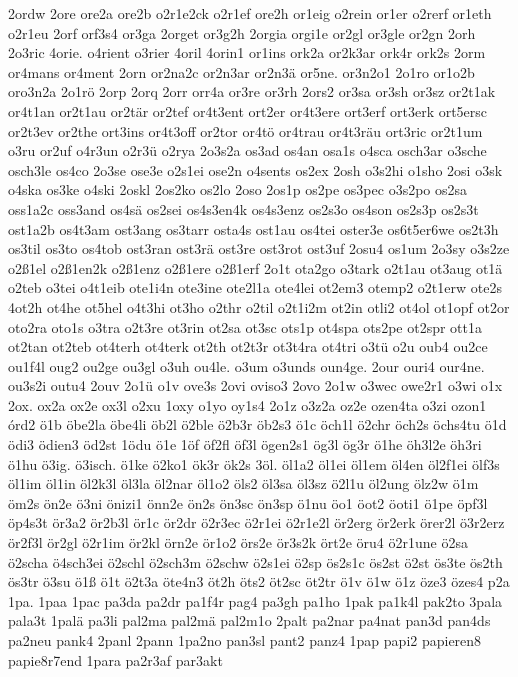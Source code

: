 {2ordw
2ore
ore2a
ore2b
o2r1e2ck
o2r1ef
ore2h
or1eig
o2rein
or1er
o2rerf
or1eth
o2r1eu
2orf
orf3s4
or3ga
2orget
or3g2h
2orgia
orgi1e
or2gl
or3gle
or2gn
2orh
2o3ric
4orie.
o4rient
o3rier
4oril
4orin1
or1ins
ork2a
or2k3ar
ork4r
ork2s
2orm
or4mans
or4ment
2orn
or2na2c
or2n3ar
or2n3ä
or5ne.
or3n2o1
2o1ro
or1o2b
oro3n2a
2o1rö
2orp
2orq
2orr
orr4a
or3re
or3rh
2ors2
or3sa
or3sh
or3sz
or2t1ak
or4t1an
or2t1au
or2tär
or2tef
or4t3ent
ort2er
or4t3ere
ort3erf
ort3erk
ort5ersc
or2t3ev
or2the
ort3ins
or4t3off
or2tor
or4tö
or4trau
or4t3räu
ort3ric
or2t1um
o3ru
or2uf
o4r3un
o2r3ü
o2rya
2o3s2a
os3ad
os4an
osa1s
o4sca
osch3ar
o3sche
osch3le
os4co
2o3se
ose3e
o2s1ei
ose2n
o4sents
os2ex
2osh
o3s2hi
o1sho
2osi
o3sk
o4ska
os3ke
o4ski
2oskl
2os2ko
os2lo
2oso
2os1p
os2pe
os3pec
o3s2po
os2sa
oss1a2c
oss3and
os4sä
os2sei
os4s3en4k
os4s3enz
os2s3o
os4son
os2s3p
os2s3t
ost1a2b
os4t3am
ost3ang
os3tarr
osta4s
ost1au
os4tei
oster3e
os6t5er6we
os2t3h
os3til
os3to
os4tob
ost3ran
ost3rä
ost3re
ost3rot
ost3uf
2osu4
os1um
2o3sy
o3s2ze
o2ß1el
o2ß1en2k
o2ß1enz
o2ß1ere
o2ß1erf
2o1t
ota2go
o3tark
o2t1au
ot3aug
ot1ä
o2teb
o3tei
o4t1eib
ote1i4n
ote3ine
ote2l1a
ote4lei
ot2em3
otemp2
o2t1erw
ote2s
4ot2h
ot4he
ot5hel
o4t3hi
ot3ho
o2thr
o2til
o2t1i2m
ot2in
otli2
ot4ol
ot1opf
ot2or
oto2ra
oto1s
o3tra
o2t3re
ot3rin
ot2sa
ot3sc
ots1p
ot4spa
ots2pe
ot2spr
ott1a
ot2tan
ot2teb
ot4terh
ot4terk
ot2th
ot2t3r
ot3t4ra
ot4tri
o3tü
o2u
oub4
ou2ce
ou1f4l
oug2
ou2ge
ou3gl
o3uh
ou4le.
o3um
o3unds
oun4ge.
2our
ouri4
our4ne.
ou3s2i
outu4
2ouv
2o1ü
o1v
ove3s
2ovi
oviso3
2ovo
2o1w
o3wec
owe2r1
o3wi
o1x
2ox.
ox2a
ox2e
ox3l
o2xu
1oxy
o1yo
oy1s4
2o1z
o3z2a
oz2e
ozen4ta
o3zi
ozon1
órd2
ö1b
öbe2la
öbe4li
öb2l
ö2ble
ö2b3r
öb2s3
ö1c
öch1l
ö2chr
öch2s
öchs4tu
ö1d
ödi3
ödien3
öd2st
1ödu
ö1e
1öf
öf2fl
öf3l
ögen2s1
ög3l
ög3r
ö1he
öh3l2e
öh3ri
ö1hu
ö3ig.
ö3isch.
ö1ke
ö2ko1
ök3r
ök2s
3öl.
öl1a2
öl1ei
öl1em
öl4en
öl2f1ei
ölf3s
öl1im
öl1in
öl2k3l
öl3la
öl2nar
öl1o2
öls2
öl3sa
öl3sz
ö2l1u
öl2ung
ölz2w
ö1m
öm2s
ön2e
ö3ni
önizi1
önn2e
ön2s
ön3sc
ön3sp
ö1nu
öo1
öot2
öoti1
ö1pe
öpf3l
öp4s3t
ör3a2
ör2b3l
ör1c
ör2dr
ö2r3ec
ö2r1ei
ö2r1e2l
ör2erg
ör2erk
örer2l
ö3r2erz
ör2f3l
ör2gl
ö2r1im
ör2kl
örn2e
ör1o2
örs2e
ör3s2k
ört2e
öru4
ö2r1une
ö2sa
ö2scha
ö4sch3ei
ö2schl
ö2sch3m
ö2schw
ö2s1ei
ö2sp
ös2s1c
ös2st
ö2st
ös3te
ös2th
ös3tr
ö3su
ö1ß
ö1t
ö2t3a
öte4n3
öt2h
öts2
öt2sc
öt2tr
ö1v
ö1w
ö1z
öze3
özes4
p2a
1pa.
1paa
1pac
pa3da
pa2dr
pa1f4r
pag4
pa3gh
pa1ho
1pak
pa1k4l
pak2to
3pala
pala3t
1palä
pa3li
pal2ma
pal2mä
pal2m1o
2palt
pa2nar
pa4nat
pan3d
pan4ds
pa2neu
pank4
2panl
2pann
1pa2no
pan3sl
pant2
panz4
1pap
papi2
papieren8
papie8r7end
1para
pa2r3af
par3akt
}

